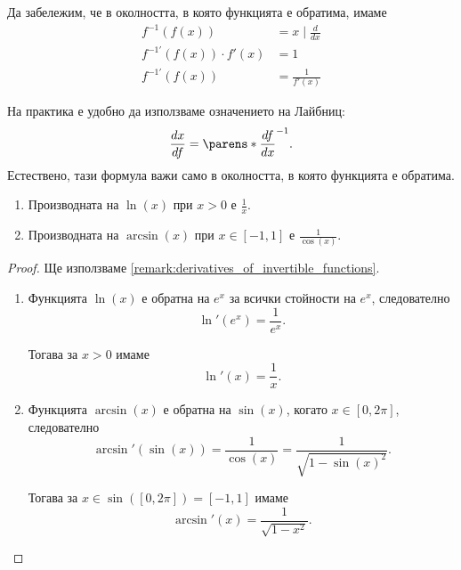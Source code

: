 \documentclass{../../common/topic}
\begin{document}
\begin{remark}\label{remark:derivatives_of_invertible_functions}
  Да забележим, че в околността, в която функцията е обратима, имаме
  \begin{align*}
    f^{-1}(f(x)) &= x \mid \frac d {dx}
    \\
    f^{-1'}(f(x)) \cdot f'(x) &= 1
    \\
    f^{-1'}(f(x)) &= \frac 1 {f'(x)}
  \end{align*}

  На практика е удобно да използваме означението на Лайбниц:
  \begin{equation*}
    \frac {dx} {df} = {\parens*{ \frac {df} {dx} }}^{-1}.
  \end{equation*}
  Естествено, тази формула важи само в околността, в която функцията е обратима.
\end{remark}

\begin{theorem}
  \hfill
  \begin{enumerate}
    \item Производната на \( \ln(x) \) при \( x > 0 \) е \( \frac 1 x \).
    \item Производната на \( \arcsin(x) \) при \( x \in [-1, 1] \) е \( \frac 1 {\cos(x)} \).
  \end{enumerate}
\end{theorem}
\begin{proof}
  Ще използваме \cref{remark:derivatives_of_invertible_functions}.

  \begin{enumerate}
    \item Функцията \( \ln(x) \) е обратна на \( e^x \) за всички стойности на \( e^x \), следователно
    \begin{equation*}
      \ln'(e^x) = \frac 1 {e^x}.
    \end{equation*}

    Тогава за \( x > 0 \) имаме
    \begin{equation*}
      \ln'(x) = \frac 1 {x}.
    \end{equation*}

    \item Функцията \( \arcsin(x) \) е обратна на \( \sin(x) \), когато \( x \in [0, 2\pi] \), следователно
    \begin{equation*}
      \arcsin'(\sin(x)) = \frac 1 {\cos(x)} = \frac 1 {\sqrt{1 - {\sin(x)}^2}}.
    \end{equation*}

    Тогава за \( x \in \sin([0, 2\pi]) = [-1, 1] \) имаме
    \begin{equation*}
      \arcsin'(x) = \frac 1 {\sqrt{1 - x^2}}.
    \end{equation*}
  \end{enumerate}
\end{proof}
\end{document}
